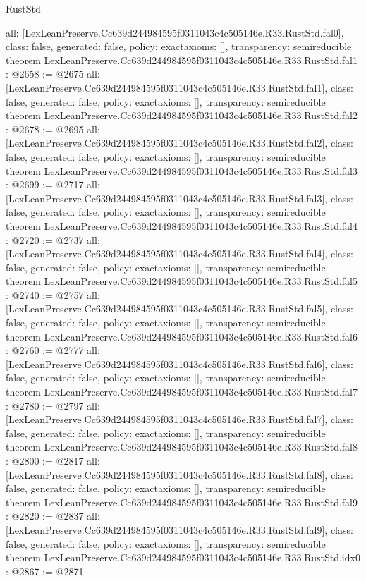 \begin{lexlean}{RustStd}
\begin{coremodule}
{  all: [LexLeanPreserve.Cc639d244984595f0311043c4c505146e.R33.RustStd.fal0],
  class: false,
  generated: false,
  policy: exact{axioms: []},
  transparency: semireducible
}
theorem LexLeanPreserve.Cc639d244984595f0311043c4c505146e.R33.RustStd.fal1 : @2658 := @2675 {
  all: [LexLeanPreserve.Cc639d244984595f0311043c4c505146e.R33.RustStd.fal1],
  class: false,
  generated: false,
  policy: exact{axioms: []},
  transparency: semireducible
}
theorem LexLeanPreserve.Cc639d244984595f0311043c4c505146e.R33.RustStd.fal2 : @2678 := @2695 {
  all: [LexLeanPreserve.Cc639d244984595f0311043c4c505146e.R33.RustStd.fal2],
  class: false,
  generated: false,
  policy: exact{axioms: []},
  transparency: semireducible
}
theorem LexLeanPreserve.Cc639d244984595f0311043c4c505146e.R33.RustStd.fal3 : @2699 := @2717 {
  all: [LexLeanPreserve.Cc639d244984595f0311043c4c505146e.R33.RustStd.fal3],
  class: false,
  generated: false,
  policy: exact{axioms: []},
  transparency: semireducible
}
theorem LexLeanPreserve.Cc639d244984595f0311043c4c505146e.R33.RustStd.fal4 : @2720 := @2737 {
  all: [LexLeanPreserve.Cc639d244984595f0311043c4c505146e.R33.RustStd.fal4],
  class: false,
  generated: false,
  policy: exact{axioms: []},
  transparency: semireducible
}
theorem LexLeanPreserve.Cc639d244984595f0311043c4c505146e.R33.RustStd.fal5 : @2740 := @2757 {
  all: [LexLeanPreserve.Cc639d244984595f0311043c4c505146e.R33.RustStd.fal5],
  class: false,
  generated: false,
  policy: exact{axioms: []},
  transparency: semireducible
}
theorem LexLeanPreserve.Cc639d244984595f0311043c4c505146e.R33.RustStd.fal6 : @2760 := @2777 {
  all: [LexLeanPreserve.Cc639d244984595f0311043c4c505146e.R33.RustStd.fal6],
  class: false,
  generated: false,
  policy: exact{axioms: []},
  transparency: semireducible
}
theorem LexLeanPreserve.Cc639d244984595f0311043c4c505146e.R33.RustStd.fal7 : @2780 := @2797 {
  all: [LexLeanPreserve.Cc639d244984595f0311043c4c505146e.R33.RustStd.fal7],
  class: false,
  generated: false,
  policy: exact{axioms: []},
  transparency: semireducible
}
theorem LexLeanPreserve.Cc639d244984595f0311043c4c505146e.R33.RustStd.fal8 : @2800 := @2817 {
  all: [LexLeanPreserve.Cc639d244984595f0311043c4c505146e.R33.RustStd.fal8],
  class: false,
  generated: false,
  policy: exact{axioms: []},
  transparency: semireducible
}
theorem LexLeanPreserve.Cc639d244984595f0311043c4c505146e.R33.RustStd.fal9 : @2820 := @2837 {
  all: [LexLeanPreserve.Cc639d244984595f0311043c4c505146e.R33.RustStd.fal9],
  class: false,
  generated: false,
  policy: exact{axioms: []},
  transparency: semireducible
}
theorem LexLeanPreserve.Cc639d244984595f0311043c4c505146e.R33.RustStd.idx0 : @2867 := @2871 {
}
\end{coremodule}
\end{lexlean}

